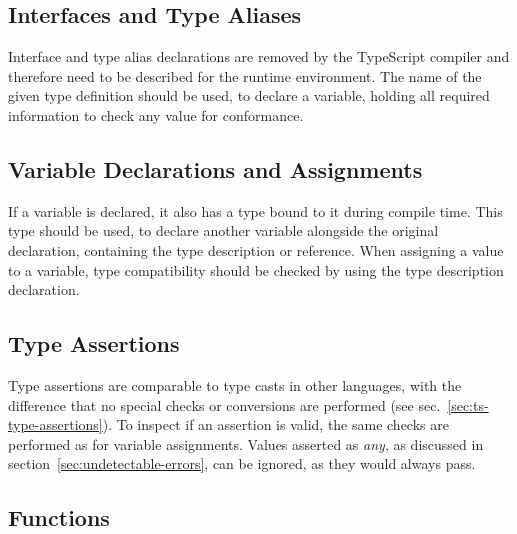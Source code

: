 \subsection{Interfaces and Type Aliases}

Interface and type alias declarations are removed by the TypeScript compiler and therefore need to be described for the runtime environment. The name of the given type definition should be used, to declare a variable, holding all required information to check any value for conformance.

\subsection{Variable Declarations and Assignments}

If a variable is declared, it also has a type bound to it during compile time. This type should be used, to declare another variable alongside the original declaration, containing the type description or reference. When assigning a value to a variable, type compatibility should be checked by using the type description declaration.

\subsection{Type Assertions}

Type assertions are comparable to type casts in other languages, with the difference that no special checks or conversions are performed (see sec.~\ref{sec:ts-type-assertions}). To inspect if an assertion is valid, the same checks are performed as for variable assignments. Values asserted as \emph{any}, as discussed in section~\ref{sec:undetectable-errors}, can be ignored, as they would always pass.


\subsection{Functions}

